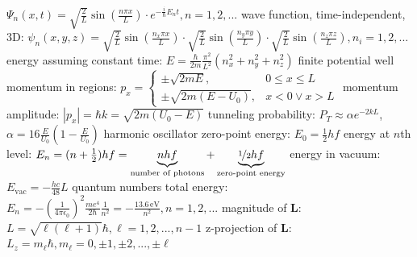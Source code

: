 \documentclass[10pt,landscape]{article}
\newcommand{\spc}{\hspace*{1em}}
\begin{document}
\begin{multicols*}{3}
\newline
\spc \spc $\Psi_n(x,t)=\sqrt{\frac{2}{L}}\sin(\frac{n\pi x}{L})\cdot e^{-\frac{i}{\hbar}E_nt},n=1,2,...$
\newline 
\spc wave function, time-independent, 3D:
\newline
\spc \spc $\psi_n(x,y,z)=\sqrt{\frac{2}{L}}\sin(\frac{n_x\pi x}{L})\cdot \sqrt{\frac{2}{L}}\sin(\frac{n_y\pi y}{L})\cdot \sqrt{\frac{2}{L}}\sin(\frac{n_z\pi z}{L}),n_i=1,2,...$
\newline
\spc \spc energy assuming constant time: $E=\frac{\hbar}{2m}\frac{\pi^2}{L^2}(n_x^2+n_y^2+n_z^2)$
\newline \newline
finite potential well
\newline
\spc momentum in regions:
\newline
\spc \spc $p_x=\left\{\begin{matrix}
\pm \sqrt{2mE},&0\leq x\leq L\\ \pm \sqrt{2m(E-U_0)},&x<0\vee x>L 
\end{matrix}\right.$
\newline
\spc momentum amplitude: $|p_x|=\hbar k=\sqrt{2m(U_0-E)}$
\newline
\spc tunneling probability: $P_T\approx \alpha e^{-2kL}$,  $\alpha=16\frac{E}{U_0}(1-\frac{E}{U_0})$
\newline \newline
harmonic oscillator
\newline
\spc zero-point energy: $E_0=\frac{1}{2}hf$
\newline
\spc energy at $n$th level: \spc\spc$E_n=(n+\frac{1}{2})hf=\underbrace{nhf}_{\textrm{number of photons}}+\underbrace{\nicefrac{1}{2}hf}_{\textrm{zero-point energy}}$
\newline
\spc energy in vacuum: $E_{\textrm{vac}}=-\frac{hc}{48}L$
\newline \newline
quantum numbers
\newline
\spc total energy: $E_n=-(\frac{1}{4\pi\epsilon_0})^2\frac{me^4}{2\hbar}\frac{1}{n^2}=-\frac{13.6\,\textrm{eV}}{n^2},n=1,2,...$
\newline
\spc magnitude of $\mathbf{L}$: $L=\sqrt{\ell(\ell+1)}\hbar,\ell=1,2,...,n-1$
\newline
\spc z-projection of $\mathbf{L}$: $L_z=m_{\ell}\hbar,m_{\ell}=0,\pm 1,\pm 2, ..., \pm \ell$

\vfill \null
\columnbreak


\end{multicols*}
\end{document}
